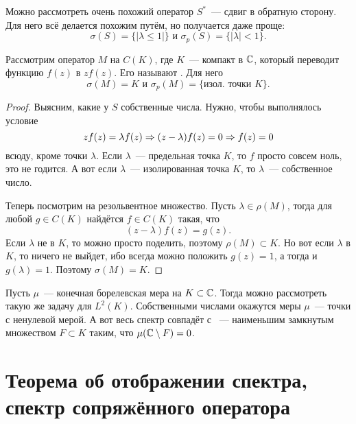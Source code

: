 \documentclass{notes}
\begin{document}
	\begin{exm}
		Можно рассмотреть очень похожий оператор $S^{*}$~--- сдвиг в обратную сторону. Для него всё делается похожим путём, но получается даже проще:
		\[
			\sigma(S) = \{|\lambda \leqslant 1|\} \text{ и } \sigma_p(S) = \{|\lambda| < 1\}.
		\]
	\end{exm}

	\begin{exm}
		Рассмотрим оператор $M$ на $C(K)$, где $K$~--- компакт в $\mathbb{C}$, который переводит функцию $f(z)$ в $zf(z)$. Его называют . Для него
		\[
			\sigma(M) = K \text{ и } \sigma_p(M) = \{\text{изол. точки } K\}.
		\]
		\begin{proof}
			Выясним, какие у $S$ собственные числа. Нужно, чтобы выполнялось условие
			\[
				zf(z) = \lambda f(z) \Rightarrow (z - \lambda) f(z) = 0 \Rightarrow f(z) = 0
			\]
			всюду, кроме точки $\lambda$. Если $\lambda$~--- предельная точка $K$, то $f$ просто совсем ноль, это не годится. А вот если $\lambda$~--- изолированная точка $K$, то $\lambda$~--- собственное число.

			Теперь посмотрим на резольвентное множество. Пусть $\lambda \in \rho(M)$, тогда для любой $g \in C(K)$ найдётся $f \in C(K)$ такая, что
			\[
				(z - \lambda) f(z) = g(z).
			\]
			Если $\lambda$ не в $K$, то можно просто поделить, поэтому $\rho(M) \subset K$. Но вот если $\lambda$ в $K$, то ничего не выйдет, ибо всегда можно положить $g(z) = 1$, а тогда и $g(\lambda) = 1$. Поэтому $\sigma(M) = K$.
		\end{proof}
	\end{exm}
	
	\begin{exm}
		Пусть $\mu$~--- конечная борелевская мера на $K \subset \mathbb{C}$. Тогда можно рассмотреть такую же задачу для $L^2(K)$. Собственными числами окажутся  меры $\mu$~--- точки с ненулевой мерой. А вот весь спектр совпадёт с ~--- наименьшим замкнутым множеством $F \subset K$ таким, что $\mu(\mathbb{C} \setminus F) = 0$.
	\end{exm}

\section{Теорема об отображении спектра, спектр сопряжённого оператора}
\end{document}
